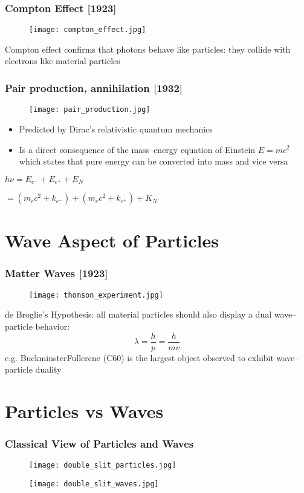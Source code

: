 \documentclass[10pt]{beamer}
\begin{document}
\begin{frame}
\frametitle{Compton Effect [1923]}
\begin{figure}
\texttt{[image: compton\_effect.jpg]}
\end{figure}
\pause Compton effect confirms that photons behave like particles: they collide
with electrons like material particles
\end{frame}

\begin{frame}
\frametitle{Pair production, annihilation [1932]}
\begin{figure}
\texttt{[image: pair\_production.jpg]}
\end{figure}
\begin{itemize}
\item Predicted by Dirac’s relativistic quantum mechanics
\item Is a direct consequence of the mass–energy equation of Einstein $E = mc^2$ which states that pure energy can be converted into mass and vice versa
\end{itemize}
\begin{center}
    \pause $h \nu = E_{e^-} + E_{e^+} + E_{N}$
\end{center}
\begin{center}
    \pause $= (m_ec^2 + k_{e^-}) + (m_ec^2 + k_{e^+}) + K_N$
\end{center}
\end{frame}

\section{Wave Aspect of Particles}
\begin{frame}
\frametitle{Matter Waves [1923]}
\begin{figure}
\texttt{[image: thomson\_experiment.jpg]}
\end{figure}
\pause de Broglie’s Hypothesis: all material particles should also display a dual \alert{wave–particle} behavior: $$\lambda = \frac{h}{p} = \frac{h}{mv}$$
\pause e.g. BuckminsterFullerene (C60) is the largest object observed to exhibit wave–particle duality
\end{frame}

\section{Particles vs Waves}

\begin{frame}
\frametitle{Classical View of Particles and Waves}
\begin{figure}
\texttt{[image: double\_slit\_particles.jpg]}
\end{figure}
\begin{figure}
\pause \texttt{[image: double\_slit\_waves.jpg]}
\end{figure}
\end{frame}
\end{document}
